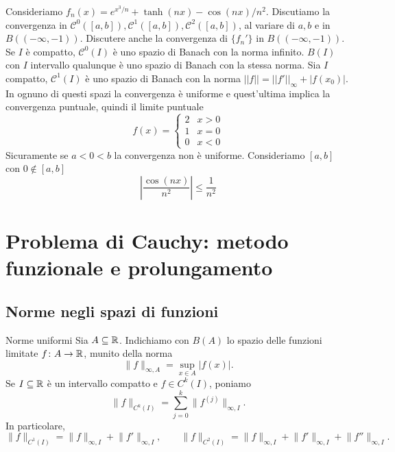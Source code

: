 \documentclass[a4paper]{article}
\begin{document}
\begin{radioactive}
\begin{snippetexample}{}
    Consideriamo \(f_n(x) = e^{x^3 / n} + \tanh(nx) - \cos(nx) / n^2\).
    Discutiamo la convergenza in \(\mathcal C^0([a,b]), \mathcal C^1([a,b]), \mathcal C^2([a,b])\),
    al variare di \(a,b\) e in \(B((-\infty, -1))\).
    Discutere anche la convergenza di \(\{f_n'\}\) in \(B((-\infty, -1))\).
    Se \(I\) è compatto, \(\mathcal C^0(I)\) è uno spazio di Banach con la norma infinito.
    \(B(I)\) con \(I\) intervallo qualunque è uno spazio di Banach con la stessa norma.
    Sia \(I\) compatto, \(\mathcal C^1(I)\) è uno spazio di Banach con la norma \(||f|| = ||f'||_{\infty} + |f(x_0)|\).
    In ognuno di questi spazi la convergenza è uniforme e quest'ultima implica la convergenza puntuale,
    quindi il limite puntuale
    \[
        f(x) =
        \begin{cases}
            2 & x > 0 \\
            1 & x = 0 \\
            0 & x < 0
        \end{cases}
    \]
    Sicuramente se \(a<0<b\) la convergenza non è uniforme.
    Consideriamo \([a,b]\) con \(0 \notin [a,b]\)
    \[
        \left|
        \frac{\cos(nx)}{n^2}
        \right| \leq \frac{1}{n^2}
    \]
\end{snippetexample}
\end{radioactive}

\section{Problema di Cauchy: metodo funzionale e prolungamento}

\subsection{Norme negli spazi di funzioni}

\begin{radioactive}
\begin{snippetdefinition}{Norme uniformi}
Sia \(A\subseteq\mathbb{R}\). Indichiamo con \(B(A)\) lo spazio delle funzioni limitate \(f\colon A\to\mathbb{R}\), munito della norma
\[
	\lVert f\rVert_{\infty,A}=\sup_{x\in A}|f(x)|.
\]
Se \(I\subseteq\mathbb{R}\) è un intervallo compatto e \(f\in C^k(I)\), poniamo
\[
	\lVert f\rVert_{C^k(I)}=\sum_{j=0}^k\lVert f^{(j)}\rVert_{\infty,I}.
\]
In particolare,
\[
	\lVert f\rVert_{C^1(I)}=\lVert f\rVert_{\infty,I}+\lVert f'\rVert_{\infty,I},
	\qquad
	\lVert f\rVert_{C^2(I)}=\lVert f\rVert_{\infty,I}+\lVert f'\rVert_{\infty,I}+\lVert f''\rVert_{\infty,I}.
\]
\end{snippetdefinition}
\end{radioactive}
\end{document}
